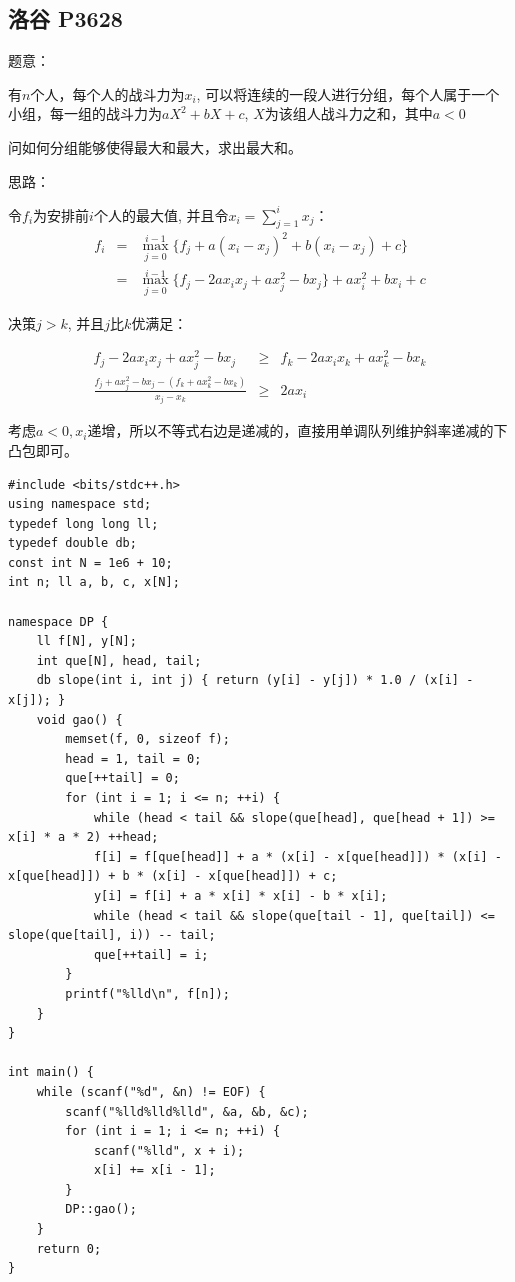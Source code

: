 \subsection{洛谷 P3628}

题意：\par
有$n$个人，每个人的战斗力为$x_i$, 可以将连续的一段人进行分组，每个人属于一个小组，每一组的战斗力为$aX^2 + bX + c$, $X$为该组人战斗力之和，其中$a < 0$\par

问如何分组能够使得最大和最大，求出最大和。\par

思路：\par
令$f_i$为安排前$i$个人的最大值, 并且令$x_i = \sum\limits_{j = 1}^i x_j$：
\begin{eqnarray*}
f_i &=& \max\limits_{j=0}^{i-1}\{f_j+a(x_i-x_j)^2+b(x_i-x_j)+c\} \\
&=& \max\limits_{j=0}^{i-1}\{f_j-2ax_ix_j+ax_j^2-bx_j\}+ax_i^2+bx_i+c
\end{eqnarray*}

决策$j > k$, 并且$j$比$k$优满足：

\begin{eqnarray*}
f_j-2ax_ix_j+ax_j^2-bx_j &\geq& f_k-2ax_ix_k+ax_k^2-bx_k \\
\frac{f_j+ax_j^2-bx_j-(f_k+ax_k^2-bx_k)}{x_j-x_k} &\ge& 2ax_i
\end{eqnarray*}

考虑$a < 0, x_i\mbox{递增}$，所以不等式右边是递减的，直接用单调队列维护斜率递减的下凸包即可。\par



\begin{lstlisting}
#include <bits/stdc++.h>
using namespace std;
typedef long long ll;
typedef double db;
const int N = 1e6 + 10;
int n; ll a, b, c, x[N]; 

namespace DP {
	ll f[N], y[N]; 
	int que[N], head, tail; 
	db slope(int i, int j) { return (y[i] - y[j]) * 1.0 / (x[i] - x[j]); }
	void gao() {
		memset(f, 0, sizeof f);
		head = 1, tail = 0;
		que[++tail] = 0;
		for (int i = 1; i <= n; ++i) { 
			while (head < tail && slope(que[head], que[head + 1]) >= x[i] * a * 2) ++head;
			f[i] = f[que[head]] + a * (x[i] - x[que[head]]) * (x[i] - x[que[head]]) + b * (x[i] - x[que[head]]) + c;
			y[i] = f[i] + a * x[i] * x[i] - b * x[i];
			while (head < tail && slope(que[tail - 1], que[tail]) <= slope(que[tail], i)) -- tail;
			que[++tail] = i;
		}
		printf("%lld\n", f[n]);
	}
}

int main() {
	while (scanf("%d", &n) != EOF) {
		scanf("%lld%lld%lld", &a, &b, &c);
		for (int i = 1; i <= n; ++i) {
			scanf("%lld", x + i);
			x[i] += x[i - 1]; 
		}
		DP::gao();
	}
	return 0;
}
\end{lstlisting}

